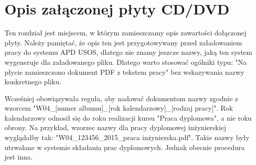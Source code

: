 \chapter{Opis załączonej płyty CD/DVD}
\label{chap:opis-plyty}
Ten rozdział jest miejscem, w którym zamieszczamy opis zawartości dołączonej płyty. Należy pamiętać, że opis ten jest przygotowywany przed załadowaniem pracy do systemu APD USOS, dlatego nie znamy jeszcze nazwy, jaką ten system wygeneruje dla załadowanego pliku. Dlatego warto stosować ogólniki typu: "Na płycie zamieszczono dokument PDF z tekstem pracy" bez wskazywania nazwy konkretnego pliku.

Wcześniej obowiązywała reguła, aby nadawać dokumentom nazwy zgodnie z wzorcem "W04\_[numer albumu]\_[rok kalendarzowy]\_[rodzaj pracy]". Rok kalendarzowy odnosił się do roku realizacji kursu "Praca dyplomowa", a nie roku obrony. Na przykład, wzorzec nazwy dla pracy dyplomowej inżynierskiej wyglądałby tak: "W04\_123456\_2015\_praca inżynierska.pdf". Takie nazwy były utrwalane w systemie składania prac dyplomowych. Jednak obecnie procedura jest inna.
